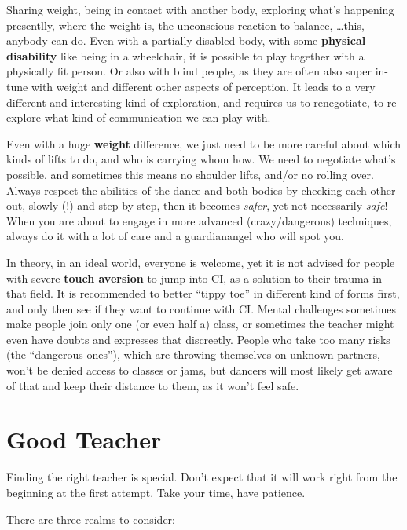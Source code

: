 Sharing weight, being in contact with another body, exploring what's happening presentlly, where the weight is, the unconscious reaction to balance, \ldots this, anybody can do.
Even with a partially disabled body, with some \textbf{physical disability} like being in a wheelchair, it is possible to play together with a physically fit person.
Or also with blind people, as they are often also super in-tune with weight and different other aspects of perception.
It leads to a very different and interesting kind of exploration, and requires us to renegotiate, to re-explore what kind of communication we can play with.

Even with a huge \textbf{weight} difference, we just need to be more careful about which kinds of lifts to do, and who is carrying whom how.
We need to negotiate what's possible, and sometimes this means no shoulder lifts, and/or no rolling over.
Always respect the abilities of the dance and both bodies by checking each other out, slowly (!) and step-by-step, then it becomes \textit{safer}, yet not necessarily \textit{safe}!
When you are about to engage in more advanced (crazy/dangerous) techniques, always do it with a lot of care and a \gls{guardianangel} who will spot you.

In theory, in an ideal world, everyone is welcome, yet it is not advised for people with severe \textbf{touch aversion} to jump into CI, as a solution to their trauma in that field.
It is recommended to better ``tippy toe'' in different kind of forms first, and only then see if they want to continue with CI\@.
Mental challenges sometimes make people join only one (or even half a) class, or sometimes the teacher might even have doubts and expresses that discreetly.
People who take too many risks (the ``dangerous ones''), which are throwing themselves on unknown partners, won't be denied access to classes or jams, but dancers will most likely get aware of that and keep their distance to them, as it won't feel safe.

\section{Good Teacher}\label{sec:good-teacher}

Finding the right teacher is special.
Don’t expect that it will work right from the beginning at the first attempt.
Take your time, have patience.

There are three realms to consider:

